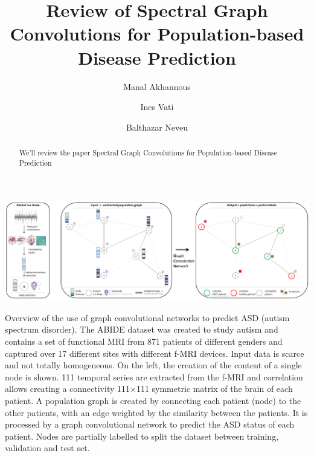 \documentclass[sigconf]{acmart}
\begin{document}
\title{Review of Spectral Graph Convolutions for Population-based Disease Prediction}

\author{Manal Akhannous}

\author{Ines Vati}

\author{Balthazar Neveu}


\renewcommand{\shortauthors}{Akhannous, Vati, Neveu}

\begin{abstract}
  We'll review the paper Spectral Graph Convolutions for Population-based Disease Prediction \cite{Parisot17}

\end{abstract}

\begin{teaserfigure}
  \includegraphics[width=\textwidth]{figures/spectral_graph_convolution_graph_overview.png}
  \caption{Overview of the use of graph convolutional networks to predict ASD (autism spectrum disorder).
  The ABIDE dataset was created to study autism and contains a set of functional MRI from 871 patients 
  of different genders and captured over 17 different sites with different f-MRI devices. Input data is scarce and not totally homogeneous.
  On the left, the creation of the content of a single node is shown. 111 temporal series are extracted from the f-MRI and correlation allows creating a connectivity 111×111 symmetric matrix of the brain of each patient.
  A population graph is created by connecting each patient (node) to the other patients, with an edge weighted by the similarity between the patients.
  It is processed by a graph convolutional network to predict the ASD status of each patient.
  Nodes are partially labelled to split the dataset between training, validation and test set.
  }
  \Description{}
  \label{fig:overview}
\end{teaserfigure}
\end{document}
